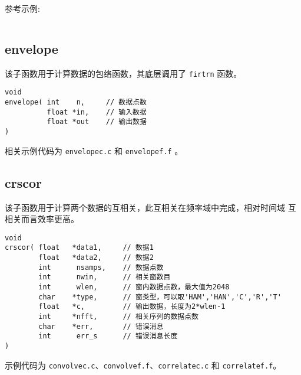 参考示例:
\inputminted{c}{./libs/firtrn.c}

\subsection{envelope}
该子函数用于计算数据的包络函数，其底层调用了 \texttt{firtrn} 函数。
\begin{verbatim}
void
envelope( int    n,     // 数据点数
          float *in,    // 输入数据
          float *out    // 输出数据
)
\end{verbatim}

相关示例代码为 \texttt{envelopec.c} 和 \texttt{envelopef.f} 。

\subsection{crscor}
该子函数用于计算两个数据的互相关，此互相关在频率域中完成，相对时间域
互相关而言效率更高。

\begin{verbatim}
void
crscor( float   *data1,     // 数据1
        float   *data2,     // 数据2
        int      nsamps,    // 数据点数
        int      nwin,      // 相关窗数目
        int      wlen,      // 窗内数据点数，最大值为2048
        char    *type,      // 窗类型，可以取'HAM','HAN','C','R','T'
        float   *c,         // 输出数据，长度为2*wlen-1
        int     *nfft,      // 相关序列的数据点数
        char    *err,       // 错误消息
        int      err_s      // 错误消息长度
)
\end{verbatim}

示例代码为 \texttt{convolvec.c}、\texttt{convolvef.f}、\texttt{correlatec.c}
和 \texttt{correlatef.f}。
